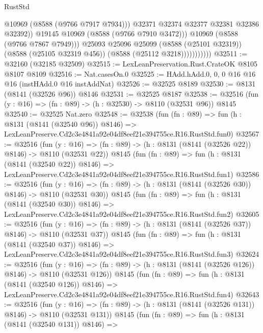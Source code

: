 \begin{lexlean}{RustStd}
\begin{coremodule}
                                @10969
                                (@8588 (@9766 @7917 @7934)))
                              @32371
                              @32374
                              @32377
                              @32381
                              @32386
                              @32392))
                          @19145
                          @10969
                          (@8588 (@9766 @7910 @3472)))
                        @10969
                        (@8588 (@9766 @7867 @7949)))
                      @25093
                      @25096
                      @25099
                      (@8588 (@25101 @32319))
                      (@8588 (@25105 @32319 @456))
                      (@8588 (@25112 @3218)))))))))))
@32511 := @32160 (@32185 @32509)
@32515 := LexLeanPreservation.Rust.CrateOK @8105 @8107 @8109
@32516 := Nat.casesOn.{0}
@32525 := HAdd.hAdd.{0, 0, 0} @16 @16 @16 (instHAdd.{0} @16 instAddNat)
@32526 := @32525 @8189
@32530 := @8131 (@8141 (@32526 @96)) @8146
@32531 := @32525 @8187
@32538 := @32516 (fun (y : @16) => (fn : @89) -> (h : @32530) -> @8110 (@32531 @96)) @8145
@32540 := @32525 Nat.zero
@32548 := @32538
    (fun (fn : @89) =>
    fun (h : @8131 (@8141 (@32540 @96)) @8146) =>
    LexLeanPreserve.Cd2c3e4841a92e04df8eef21e394755ce.R16.RustStd.fun0)
@32567 := @32516
    (fun (y : @16) => (fn : @89) -> (h : @8131 (@8141 (@32526 @22)) @8146) -> @8110 (@32531 @22))
    @8145
    (fun (fn : @89) =>
    fun (h : @8131 (@8141 (@32540 @22)) @8146) =>
    LexLeanPreserve.Cd2c3e4841a92e04df8eef21e394755ce.R16.RustStd.fun1)
@32586 := @32516
    (fun (y : @16) => (fn : @89) -> (h : @8131 (@8141 (@32526 @30)) @8146) -> @8110 (@32531 @30))
    @8145
    (fun (fn : @89) =>
    fun (h : @8131 (@8141 (@32540 @30)) @8146) =>
    LexLeanPreserve.Cd2c3e4841a92e04df8eef21e394755ce.R16.RustStd.fun2)
@32605 := @32516
    (fun (y : @16) => (fn : @89) -> (h : @8131 (@8141 (@32526 @37)) @8146) -> @8110 (@32531 @37))
    @8145
    (fun (fn : @89) =>
    fun (h : @8131 (@8141 (@32540 @37)) @8146) =>
    LexLeanPreserve.Cd2c3e4841a92e04df8eef21e394755ce.R16.RustStd.fun3)
@32624 := @32516
    (fun (y : @16) => (fn : @89) -> (h : @8131 (@8141 (@32526 @126)) @8146) -> @8110 (@32531 @126))
    @8145
    (fun (fn : @89) =>
    fun (h : @8131 (@8141 (@32540 @126)) @8146) =>
    LexLeanPreserve.Cd2c3e4841a92e04df8eef21e394755ce.R16.RustStd.fun4)
@32643 := @32516
    (fun (y : @16) => (fn : @89) -> (h : @8131 (@8141 (@32526 @131)) @8146) -> @8110 (@32531 @131))
    @8145
    (fun (fn : @89) =>
    fun (h : @8131 (@8141 (@32540 @131)) @8146) =>

\end{coremodule}
\end{lexlean}
